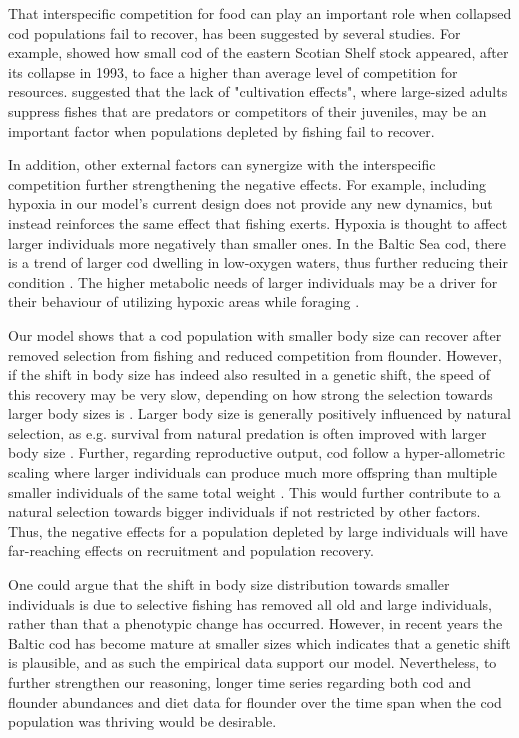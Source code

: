 \documentclass[9pt,twocolumn,twoside]{pnas-new}
\begin{document}
That interspecific competition for food can play an important role when collapsed cod populations fail to recover, has been suggested by several studies. For example, \citep{Bundy2005} showed how small cod of the eastern Scotian Shelf stock appeared, after its collapse in 1993, to face a higher than average level of competition for resources. \citep{Walters2001} suggested that the lack of "cultivation effects", where large-sized adults suppress fishes that are predators or competitors of their juveniles, may be an important factor when populations depleted by fishing fail to recover.

In addition, other external factors can synergize with the interspecific competition further strengthening the negative effects. For example, including hypoxia in our model's current design does not provide any new dynamics, but instead reinforces the same effect that fishing exerts. Hypoxia is thought to affect larger individuals more negatively than smaller ones. In the Baltic Sea cod, there is a trend of larger cod dwelling in  low-oxygen waters, thus further reducing their condition \citep{Casini2021, Lindmark2023}. The higher metabolic needs of larger individuals may be a driver for their behaviour of utilizing hypoxic areas while foraging \citep{Reale2010}.

Our model shows that a cod population with smaller body size can recover after removed selection from fishing and reduced competition from flounder. However, if the shift in body size has indeed also resulted in a genetic shift, the speed of this recovery may be very slow, depending on how strong the selection towards larger body sizes is \citep{Ahti2020}. Larger body size is generally positively influenced by natural selection, as e.g. survival from natural predation is often improved with larger body size \citep{Olsen2011}. Further, regarding reproductive output, cod follow a hyper-allometric scaling where larger individuals can produce much more offspring than multiple smaller individuals of the same total weight \citep{Barneche2018}. This would further contribute to a natural selection towards bigger individuals if not restricted by other factors. Thus, the negative effects for a population depleted by large individuals will have far-reaching effects on recruitment and population recovery.

One could argue that the shift in body size distribution towards smaller individuals is due to selective fishing has removed all old and large individuals, rather than that a phenotypic change has occurred. However, in recent years the Baltic cod has become mature at smaller sizes \citep{Koster2017} which indicates that a genetic shift is plausible, and as such the empirical data support our model. Nevertheless, to further strengthen our reasoning, longer time series regarding both cod and flounder abundances and diet data for flounder over the time span when the cod population was thriving would be desirable. 
\end{document}
